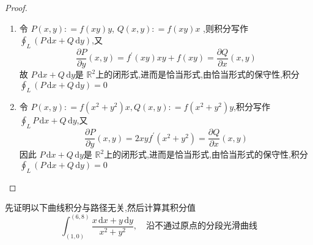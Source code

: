 \documentclass[lang=cn,12pt,color=green,fontset=none,thmcnt=section]{elegantbook}
\begin{document}
\begin{proof}
    \begin{enumerate}
        \item 令 $ P\left( x,y \right): = f\left( xy \right)y   $, $ Q \left( x,y \right): = f\left( xy \right)x   $  ,则积分写作 $ \oint_{L} \left( P\,\mathrm{d} x+ Q\,\mathrm{d} y \right)  $,又 $$
         \frac{\partial P}{\partial y}\left( x,y \right)  = f^{\prime} \left( xy \right) xy+  f\left( xy \right) = \frac{\partial Q}{\partial x}\left( x,y \right)   
        $$ 故 $ P\,\mathrm{d} x+ Q\,\mathrm{d} y $是 $\mathbb{R} ^{2} $上的闭形式,进而是恰当形式,由恰当形式的保守性,积分 \\ 
         $ \oint_{L} \left( P\,\mathrm{d} x+ Q\,\mathrm{d} y \right)=0  $   
        
        \item 令 $ P\left( x,y \right): = f\left( x^{2}+ y^{2} \right)x ,Q\left( x,y \right): = f\left( x^{2}+ y^{2} \right)y     $,积分写作 $ \oint_{L} P\,\mathrm{d} x+ Q\,\mathrm{d} y $,又 $$
        \frac{\partial P}{\partial y}\left( x,y \right) = 2xyf^{\prime} \left( x^{2}+ y^{2} \right)   = \frac{\partial Q}{\partial x}\left( x,y \right) 
        $$  因此 $ P\,\mathrm{d} x+ Q\,\mathrm{d} y $是 $ \mathbb{R} ^{2} $上的闭形式,进而是恰当形式,由恰当形式的保守性,积分 \\ 
         $ \oint_{L}\left( P\,\mathrm{d} x+ Q\,\mathrm{d} y \right)=0  $   
    \end{enumerate}
    
\end{proof}

\begin{exercise}
    先证明以下曲线积分与路径无关,然后计算其积分值 $$
    \int_{\left( 1,0 \right) }^{\left( 6,8 \right) } \frac{ x \,\mathrm{d} x +  y \,\mathrm{d} y }{  x^{2}+ y^{2}} ,\quad \text{沿不通过原点的分段光滑曲线} 
    $$ 
\end{exercise}
\end{document}

